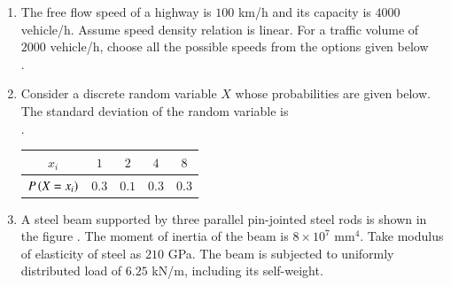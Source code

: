 \documentclass[journal,12pt,onecolumn]{article}
\theoremstyle{remark}
\begin{document}
\begin{enumerate}
    \hfill{}
    \begin{enumerate}
    \end{enumerate}

    \item The free flow speed of a highway is $100$ km/h and its capacity is $4000$ vehicle/h. Assume speed density relation is linear.
    For a traffic volume of $2000$ vehicle/h, choose all the possible speeds  from the options given below \\ .
    
    \hfill{}
    \begin{enumerate}
    \end{enumerate}

    \item Consider a discrete random variable $X$ whose probabilities are given below. The standard deviation of the random variable is \underline{\hspace{2cm}} \\ .
    \begin{center}
    \begin{tabular}{|c|c|c|c|c|}
        \hline
        $x_i$ & $1$ & $2$ & $4$ & $8$ \\
        \hline
        $P\left(X=x_i\right)$ & $0.3$ & $0.1$ & $0.3$ & $0.3$ \\
        \hline
    \end{tabular}
    \end{center}
    
    \hfill{}

    \item A steel beam supported by three parallel pin-jointed steel rods is shown in the figure . The moment of inertia of the beam is $8 \times 10^7$ mm$^4$. Take modulus of elasticity of steel as $210$ GPa. The beam is subjected to uniformly distributed load of $6.25$ kN/m, including its self-weight.
    

\end{enumerate}
\end{document}

